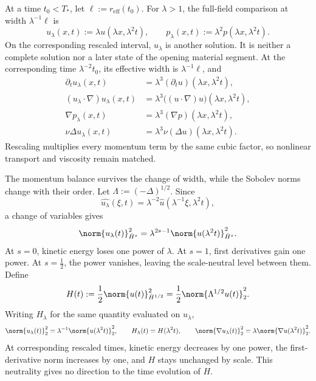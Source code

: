 
At a time \(t_0<T_*\), let \(\ell:=r_{\mathrm{eff}}(t_0)\). For \(\lambda>1\), the full-field comparison at width \(\lambda^{-1}\ell\) is
\[
  u_\lambda(x,t)
  :=
  \lambda u(\lambda x,\lambda^2t),
  \qquad
  p_\lambda(x,t)
  :=
  \lambda^2p(\lambda x,\lambda^2t).
\]
On the corresponding rescaled interval, \(u_\lambda\) is another \NavierStokes{} solution. It is neither a complete solution nor a later state of the opening material segment. At the corresponding time \(\lambda^{-2}t_0\), its effective width is \(\lambda^{-1}\ell\), and
\[
\begin{aligned}
  \partial_tu_\lambda(x,t)
  &=
  \lambda^3(\partial_tu)(\lambda x,\lambda^2t),
  \\
  (u_\lambda\cdot\nabla)u_\lambda(x,t)
  &=
  \lambda^3\bigl((u\cdot\nabla)u\bigr)(\lambda x,\lambda^2t),
  \\
  \nabla p_\lambda(x,t)
  &=
  \lambda^3(\nabla p)(\lambda x,\lambda^2t),
  \\
  \nu\Delta u_\lambda(x,t)
  &=
  \lambda^3\nu(\Delta u)(\lambda x,\lambda^2t).
\end{aligned}
\]
Rescaling multiplies every momentum term by the same cubic factor, so nonlinear transport and viscosity remain matched.


The momentum balance survives the change of width, while the Sobolev norms change with their order. Let \(\Lambda:=(-\Delta)^{1/2}\). Since
\[
  \widehat{u_\lambda}(\xi,t)
  =
  \lambda^{-2}\widehat u(\lambda^{-1}\xi,\lambda^2t),
\]
a change of variables gives
\[
  \norm{u_\lambda(t)}_{\dot H^s}^2
  =
  \lambda^{2s-1}
  \norm{u(\lambda^2t)}_{\dot H^s}^2.
\]
At \(s=0\), kinetic energy loses one power of \(\lambda\). At \(s=1\), first derivatives gain one power. At \(s=\tfrac12\), the power vanishes, leaving the scale-neutral level between them. Define
\[
  H(t)
  :=
  \frac12\norm{u(t)}_{\dot H^{1/2}}^2
  =
  \frac12\norm{\Lambda^{1/2}u(t)}_2^2.
\]
Writing \(H_\lambda\) for the same quantity evaluated on \(u_\lambda\),
\[
  \norm{u_\lambda(t)}_2^2
  =
  \lambda^{-1}\norm{u(\lambda^2t)}_2^2,
  \qquad
  H_\lambda(t)=H(\lambda^2t),
  \qquad
  \norm{\nabla u_\lambda(t)}_2^2
  =
  \lambda\norm{\nabla u(\lambda^2t)}_2^2.
\]
At corresponding rescaled times, kinetic energy decreases by one power, the first-derivative norm increases by one, and \(H\) stays unchanged by scale. This neutrality gives no direction to the time evolution of \(H\).

